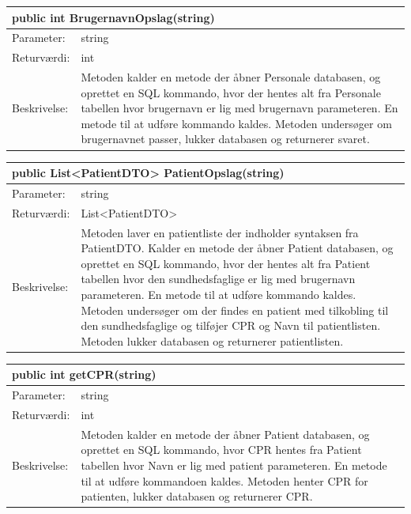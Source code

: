 \begin{table}[H]
\label{tab:tabel2}
\begin{tabular}{| l | p{13cm} |}
   \hline
   \multicolumn{2}{|l|}{public int BrugernavnOpslag(string)} \\ \hline
   Parameter: & string \\ \hline
   Returværdi: & int\\ \hline
   Beskrivelse: & Metoden kalder en metode der åbner Personale databasen, og oprettet en SQL kommando, hvor der hentes alt fra Personale tabellen hvor brugernavn er lig med brugernavn parameteren. En metode til at udføre kommando kaldes. Metoden undersøger om brugernavnet passer, lukker databasen og returnerer svaret. \\ \hline
\end{tabular}
\end{table}
\begin{table}[H]
\label{tab:tabel2}
\begin{tabular}{| l | p{13cm} |}
   \hline
   \multicolumn{2}{|l|}{public List<PatientDTO> PatientOpslag(string)} \\ \hline
   Parameter: & string \\ \hline
   Returværdi: & List<PatientDTO>\\ \hline
   Beskrivelse: & Metoden laver en patientliste der indholder syntaksen fra PatientDTO. Kalder en metode der åbner Patient databasen, og oprettet en SQL kommando, hvor der hentes alt fra Patient tabellen hvor den sundhedsfaglige er lig med brugernavn parameteren. En metode til at udføre kommando kaldes. Metoden undersøger om der findes en patient med tilkobling til den sundhedsfaglige og tilføjer CPR og Navn til patientlisten. Metoden lukker databasen og returnerer patientlisten. \\ \hline
\end{tabular}
\end{table}
\begin{table}[H]
\label{tab:tabel2}
\begin{tabular}{| l | p{13cm} |}
   \hline
   \multicolumn{2}{|l|}{public int getCPR(string)} \\ \hline
   Parameter: & string \\ \hline
   Returværdi: & int\\ \hline
   Beskrivelse: & Metoden kalder en metode der åbner Patient databasen, og oprettet en SQL kommando, hvor CPR hentes fra Patient tabellen hvor Navn er lig med patient parameteren. En metode til at udføre kommandoen kaldes. Metoden henter CPR for patienten, lukker databasen og returnerer CPR. \\ \hline
\end{tabular}
\end{table}
